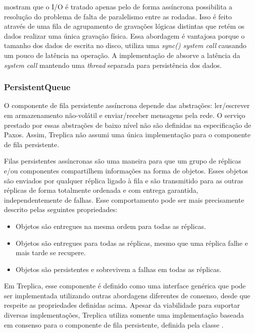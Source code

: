  mostram que o I/O é tratado apenas pelo  de
forma assíncrona possibilita a resolução do problema de falta de paralelismo entre as
rodadas. Isso é feito através de uma fila de agrupamento de gravações lógicas distintas
que retém os dados realizar uma única gravação física. Essa abordagem é vantajosa porque o
tamanho dos dados de escrita no disco, utiliza uma \emph{sync() system call} causando um
pouco de latência na operação. A implementação de  absorve a latência
da \emph{system call} mantendo uma \emph{thread} separada para persistência dos dados.

\subsubsection{PersistentQueue}

O componente de fila persistente assíncrona depende das abstrações: ler/escrever em
armazenamento não-volátil e enviar/receber mensagens pela rede. O serviço prestado por
essas abstrações de baixo nível não são definidas na especificação de Paxos. Assim,
Treplica não assumi uma única implementação para o componente de fila persistente.

Filas persistentes assíncronas são uma maneira para que um grupo de réplicas e/ou
componentes compartilhem informações na forma de objetos. Esses objetos são enviados por
qualquer réplica ligado à fila e são transmitido para as outras réplicas de forma
totalmente ordenada e com entrega garantida, independentemente de falhas. Esse
comportamento pode ser mais precisamente descrito pelas seguintes propriedades:

\begin{itemize}
  \item Objetos são entregues na mesma ordem para todas as réplicas.
  \item Objetos são entregues para todas as réplicas, mesmo que uma réplica falhe e mais
    tarde se recupere.
  \item Objetos são persistentes e sobrevivem a falhas em todas as réplicas.
\end{itemize}

Em Treplica, esse componente é definido como uma interface genérica que pode ser
implementada utilizando outras abordagens diferentes de consenso, desde que respeite as
propriedades definidas acima. Apesar da viabilidade para suportar diversas implementações,
Treplica utiliza somente uma implementação baseada em consenso para o componente de fila
persistente, definida pela classe .

